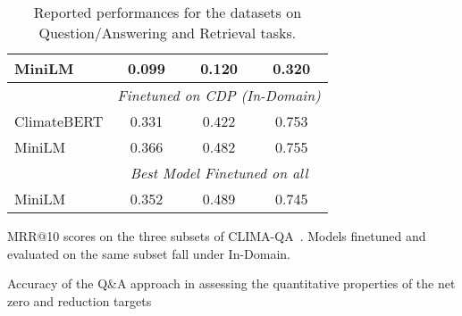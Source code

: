 \begin{table*}[ht]
\begin{subtable}[t]{0.43\textwidth}
{\begin{tabular}{lccc}
        MiniLM         & 0.099               & 0.120               & 0.320             \\
        \midrule
        & \multicolumn{3}{c}{\textit{Finetuned on CDP (In-Domain)}} \\
        ClimateBERT    & 0.331               & 0.422               & 0.753             \\
        MiniLM         & 0.366               & 0.482               & 0.755             \\
        \midrule
        & \multicolumn{3}{c}{\textit{Best Model Finetuned on all}} \\
        MiniLM         & 0.352               & 0.489               & 0.745             \\
        \bottomrule
        \end{tabular}
    }
    \caption{MRR@10 scores on the three subsets of CLIMA-QA~\cite{spokoyny2023answering}. Models finetuned and evaluated on the same subset fall under In-Domain.}
    \label{tab:appendix climaqa}
    \end{subtable}
     \begin{subtable}[t]{0.52\textwidth}
        \vspace{-2.2cm}
    \caption{Accuracy of the Q\&A approach in assessing the quantitative properties of the net zero and reduction targets~\cite{tobias_schimanski_climatebert-netzero_2023}}
    \label{tab:qa_accuracy}
    \end{subtable}
    \caption{Reported performances for the datasets on Question/Answering and Retrieval tasks.}
    \label{tab:reported perf question asnwering (qa)}
\end{table*}  

\newpage

